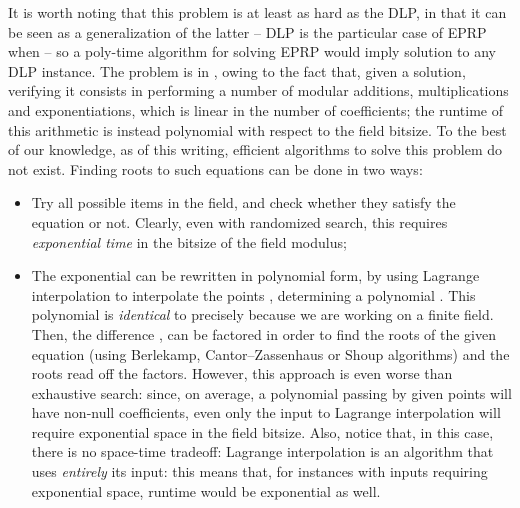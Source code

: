 \documentclass[10pt,journal,cspaper,compsoc]{IEEEtran}
\begin{document}
It is worth noting that this problem is at least as hard as the DLP, in that it can be seen as a generalization of the latter -- DLP is the particular case of EPRP when  -- so a poly-time algorithm for solving EPRP would imply solution to any DLP instance. The problem is in , owing to the fact that, given a solution, verifying it consists in performing a number of modular additions, multiplications and exponentiations, which is linear in the number of coefficients; the runtime of this arithmetic is instead polynomial with respect to the field bitsize. To the best of our knowledge, as of this writing, efficient algorithms to solve this problem  do not exist. Finding roots to such equations can be done in two ways:
\begin{itemize}
\item Try all possible items  in the field, and check whether they satisfy the equation or not. Clearly, even with randomized search, this requires \emph{exponential time} in the bitsize of the field modulus;
\item The exponential  can be rewritten in polynomial form, by using Lagrange interpolation to interpolate the points , determining a polynomial . This polynomial is \emph{identical} to  precisely because we are working on a finite field. Then, the difference , can be factored in order to find the roots of the given equation (using Berlekamp, Cantor--Zassenhaus or Shoup algorithms) and the roots read off the factors. However, this approach is even worse than exhaustive search: since, on average, a polynomial passing by  given points will have  non-null coefficients, even only the input to Lagrange interpolation will require exponential space in the field bitsize. Also, notice that, in this case, there is no space-time tradeoff: Lagrange interpolation is an algorithm that uses \emph{entirely} its input: this means that, for instances with inputs requiring exponential space, runtime would be exponential as well.
\end{itemize}
\end{document}
